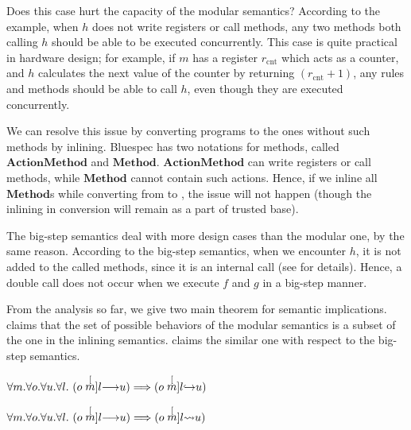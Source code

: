 Does this case hurt the capacity of the modular semantics? According
to the example, when $h$ does not write registers or call methods, any
two methods both calling $h$ should be able to be executed
concurrently. This case is quite practical in hardware design; for
example, if $m$ has a register $r_{\textrm{cnt}}$ which acts as a
counter, and $h$ calculates the next value of the counter by returning
$(r_{\textrm{cnt}} + 1)$, any rules and methods should be able to call
$h$, even though they are executed concurrently.

We can resolve this issue by converting programs to the ones without
such methods by inlining. Bluespec has two notations for methods,
called $\textbf{ActionMethod}$ and
$\textbf{Method}$. $\textbf{ActionMethod}$ can write registers or call
methods, while $\textbf{Method}$ cannot contain such actions. Hence,
if we inline all $\textbf{Method}$s while converting from \Bluespec{}
to \Kami{}, the issue will not happen (though the inlining in
conversion will remain as a part of trusted base).

The big-step semantics deal with more design cases than the modular
one, by the same reason. According to the big-step semantics, when we
encounter $h$, it is not added to the called methods, since it is an
internal call (see  for details). Hence, a
double call does not occur when we execute $f$ and $g$ in a big-step
manner.

From the analysis so far, we give two main theorem for semantic
implications.  claims that the set of possible
behaviors of the modular semantics is a subset of the one in the
inlining semantics.  claims the similar one with
respect to the big-step semantics.

\begin{theorem}
  \label{thm-modtoinl}
  \mbox{}
  \begin{center}
    \begin{math}
      \forall m.\forall o.\forall u.\forall l.\ 
      (\semstep{m}{o}{u}{l}) \Longrightarrow (\semstepin{m}{o}{u}{l})
    \end{math}
  \end{center}
\end{theorem}

\begin{theorem}
  \label{thm-modtobig}
  \mbox{}
  \begin{center}
    \begin{math}
      \forall m.\forall o.\forall u.\forall l.\ 
      (\semstep{m}{o}{u}{l}) \Longrightarrow (\sembigstep{m}{o}{u}{l})
    \end{math}
  \end{center}
\end{theorem}


